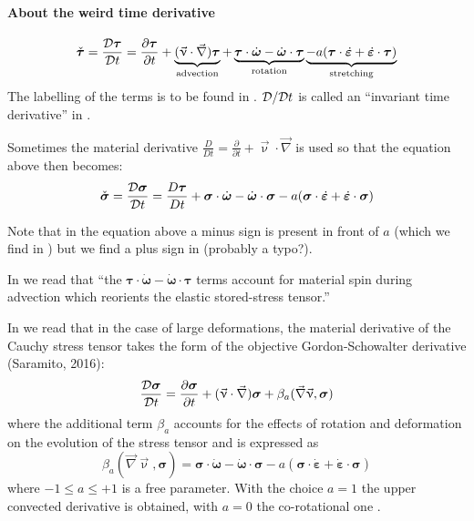 \paragraph{About the weird time derivative}



\[
\check{\bm\tau} = 
\frac{{\cal D}{\bm \tau}}{{\cal D} t} = \frac{\partial{\bm \tau}}{\partial t}
+ \underbrace{(\vec\upnu \cdot \vec\nabla) {\bm \tau} }_{\rm advection}
+ \underbrace{{\bm \tau}\cdot \dot{\bm \omega} - \dot{\bm \omega}\cdot {\bm \tau}}_{\rm rotation}
\underbrace{- a ( {\bm \tau} \cdot \dot{\bm \varepsilon} + \dot{\bm \varepsilon} \cdot {\bm \tau})}_{\rm stretching}
\]
The labelling of the terms is to be found in \cite{moql07}.
${\cal D}/{\cal D} t$ is called an ``invariant time derivative'' in \cite{hard91}.

Sometimes the material derivative $\frac{D}{Dt} = \frac{\partial }{\partial t} + \vec\upnu \cdot \vec\nabla$
is used so that the equation above then becomes:
\[
\check{\bm\sigma} = 
\frac{{\cal D}{\bm \sigma}}{{\cal D} t} = \frac{D {\bm\tau}}{Dt}
+ {\bm \sigma}\cdot \dot{\bm \omega} - \dot{\bm \omega}\cdot {\bm \sigma}
- a ( {\bm \sigma} \cdot \dot{\bm \varepsilon} + \dot{\bm \varepsilon} \cdot {\bm \sigma})
\]

Note that in the equation above a minus sign is present in front of $a$ (which we 
find in \cite{hard91,momy93,daws16}) but we find a plus sign in \cite{moql07} (probably a typo?). 

In \cite{modm01} we read that ``the ${\bm\tau}\cdot \dot{\bm\omega}-\dot{\bm\omega}\cdot {\bm\tau}$ terms account 
for material spin during advection which reorients the elastic stored-stress tensor.''

In \cite{daws16} we read that 
in the case of large deformations, the material derivative of the Cauchy
stress tensor takes the form of the objective Gordon-Schowalter derivative (Saramito, 2016):
\[
\frac{{\cal D}{\bm \sigma}}{{\cal D} t} = \frac{\partial{\bm \sigma}}{\partial t}
+ (\vec\upnu \cdot \vec\nabla) {\bm \sigma} +
\beta_a (\vec\nabla\vec\upnu,{\bm \sigma})
\]
where the additional term $\beta_a$  accounts for the effects
of rotation and deformation on the evolution of the stress tensor 
and is expressed as 
\[
\beta_a (\vec\nabla\vec\upnu,{\bm \sigma})
= 
{\bm \sigma}\cdot \dot{\bm \omega} - \dot{\bm \omega}\cdot {\bm \sigma}
- a ( {\bm \sigma} \cdot \dot{\bm \varepsilon}
+ \dot{\bm \varepsilon} \cdot {\bm \sigma})
\]
where $-1 \le a \le +1$ is a free parameter. 
With the choice $a = 1$ the upper convected derivative is obtained, 
with $a = 0$ the co-rotational one \cite{hard91}.

